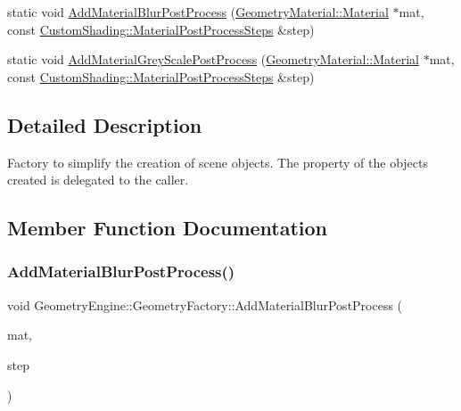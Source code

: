 \begin{DoxyCompactItemize}
\item 
static void \mbox{\hyperlink{class_geometry_engine_1_1_geometry_factory_a021fcafcfa0fdd154a9112fa340162a9}{Add\+Material\+Blur\+Post\+Process}} (\mbox{\hyperlink{class_geometry_engine_1_1_geometry_material_1_1_material}{Geometry\+Material\+::\+Material}} $\ast$mat, const \mbox{\hyperlink{namespace_geometry_engine_1_1_custom_shading_af8b09b91ca7086f4f67a5d4181f35e58}{Custom\+Shading\+::\+Material\+Post\+Process\+Steps}} \&step)
\item 
static void \mbox{\hyperlink{class_geometry_engine_1_1_geometry_factory_a59a8934b2f66247a7edda001316cc7b1}{Add\+Material\+Grey\+Scale\+Post\+Process}} (\mbox{\hyperlink{class_geometry_engine_1_1_geometry_material_1_1_material}{Geometry\+Material\+::\+Material}} $\ast$mat, const \mbox{\hyperlink{namespace_geometry_engine_1_1_custom_shading_af8b09b91ca7086f4f67a5d4181f35e58}{Custom\+Shading\+::\+Material\+Post\+Process\+Steps}} \&step)
\end{DoxyCompactItemize}


\subsection{Detailed Description}
Factory to simplify the creation of scene objects. The property of the objects created is delegated to the caller. 

\subsection{Member Function Documentation}
\mbox{\label{class_geometry_engine_1_1_geometry_factory_a021fcafcfa0fdd154a9112fa340162a9}} 
\subsubsection{\texorpdfstring{AddMaterialBlurPostProcess()}{AddMaterialBlurPostProcess()}}
{\footnotesize\ttfamily void Geometry\+Engine\+::\+Geometry\+Factory\+::\+Add\+Material\+Blur\+Post\+Process (\begin{DoxyParamCaption}\item[{\mbox{\hyperlink{class_geometry_engine_1_1_geometry_material_1_1_material}{Geometry\+Material\+::\+Material}} $\ast$}]{mat,  }\item[{const \mbox{\hyperlink{namespace_geometry_engine_1_1_custom_shading_af8b09b91ca7086f4f67a5d4181f35e58}{Custom\+Shading\+::\+Material\+Post\+Process\+Steps}} \&}]{step }\end{DoxyParamCaption})\hspace{0.3cm}{\ttfamily [static]}}

